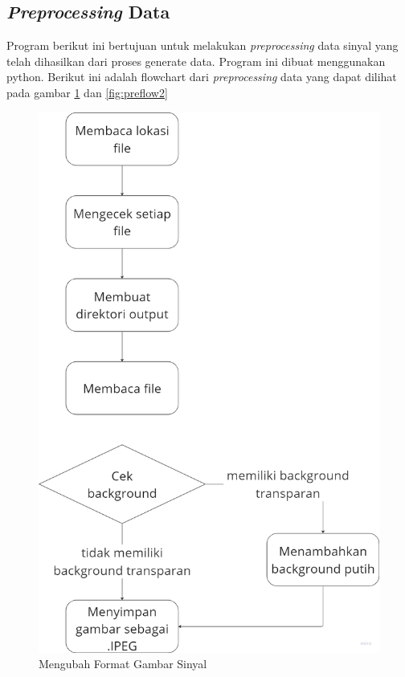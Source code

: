 \subsection{\emph{Preprocessing} Data}
Program berikut ini bertujuan untuk melakukan \emph{preprocessing} data sinyal yang telah dihasilkan dari proses generate data. Program ini dibuat menggunakan python. Berikut ini adalah flowchart dari \emph{preprocessing} data yang dapat dilihat pada gambar \ref{fig:preflow1} dan \ref{fig:preflow2}

\begin{figure} [H] \centering
  \includegraphics[scale=0.1]{gambar/bab3/preflow1.png}
  \caption{Mengubah Format Gambar Sinyal}
  \label{fig:preflow1}
\end{figure}

